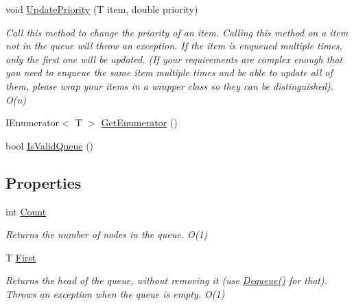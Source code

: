 \begin{DoxyCompactItemize}
void \hyperlink{class_priority___queue_1_1_simple_priority_queue_a90988345298443d824db48ae0fa35f2f}{Update\+Priority} (T item, double priority)
\begin{DoxyCompactList}\small\item\em Call this method to change the priority of an item. Calling this method on a item not in the queue will throw an exception. If the item is enqueued multiple times, only the first one will be updated. (If your requirements are complex enough that you need to enqueue the same item multiple times {\itshape and} be able to update all of them, please wrap your items in a wrapper class so they can be distinguished). O(n) \end{DoxyCompactList}\item 
I\+Enumerator$<$ T $>$ \hyperlink{class_priority___queue_1_1_simple_priority_queue_ab045d436a8cc1b85d4cb8d37f6f33b58}{Get\+Enumerator} ()
\item 
bool \hyperlink{class_priority___queue_1_1_simple_priority_queue_a98351afbd0dfa324b0be7806f1e17aa7}{Is\+Valid\+Queue} ()
\end{DoxyCompactItemize}
\subsection*{Properties}
\begin{DoxyCompactItemize}
\item 
int \hyperlink{class_priority___queue_1_1_simple_priority_queue_a366f0a020200ba48e64afe8064ef014c}{Count}
\begin{DoxyCompactList}\small\item\em Returns the number of nodes in the queue. O(1) \end{DoxyCompactList}\item 
T \hyperlink{class_priority___queue_1_1_simple_priority_queue_ab8d3592674c629038086a006069bb9dd}{First}
\begin{DoxyCompactList}\small\item\em Returns the head of the queue, without removing it (use \hyperlink{class_priority___queue_1_1_simple_priority_queue_ad17b59ab99b074c9f697fee41b7583c3}{Dequeue()} for that). Throws an exception when the queue is empty. O(1) \end{DoxyCompactList}\end{DoxyCompactItemize}



